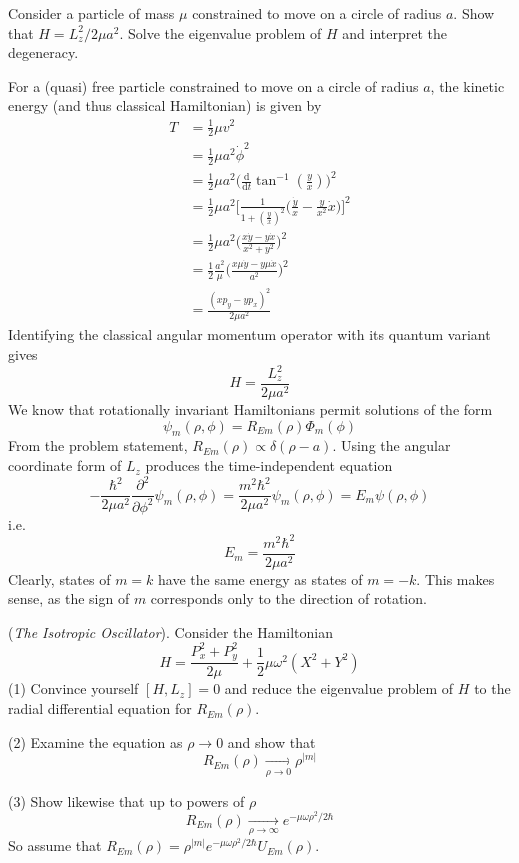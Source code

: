 \documentclass[../principles-of-quantum-mechanics.tex]{subfiles}
\begin{document}
\begin{questions}
	\question Consider a particle of mass $\mu$ constrained to move on a circle of radius $a$. Show that $H = L_z^2/2\mu a^2$. Solve the eigenvalue problem of $H$ and interpret the degeneracy.
	\begin{solution}
		For a (quasi) free particle constrained to move on a circle of radius $a$, the kinetic energy (and thus classical Hamiltonian) is given by
		\begin{align*}
			T &= \frac{1}{2}\mu v^2 \\
			&= \frac{1}{2}\mu a^2\dot{\phi}^2 \\
			&= \frac{1}{2}\mu a^2\Big(\frac{\mathrm{d}}{\mathrm{d}t}\tan^{-1}(\tfrac{y}{x})\Big)^2 \\
			&= \frac{1}{2}\mu a^2\Big[\frac{1}{1 + (\tfrac{y}{x})^2}\Big(\frac{\dot{y}}{x} - \frac{y}{x^2}\dot{x}\Big)\Big]^2 \\
			&= \frac{1}{2}\mu a^2\Big(\frac{x\dot{y} - y\dot{x}}{x^2 + y^2}\Big)^2 \\
			&= \frac{1}{2}\frac{a^2}{\mu}\Big(\frac{x\mu\dot{y} - y\mu\dot{x}}{a^2}\Big)^2 \\
			&= \frac{(xp_y - yp_x)^2}{2\mu a^2}
		\end{align*}
		Identifying the classical angular momentum operator with its quantum variant gives
		$$H = \frac{L_z^2}{2\mu a^2}$$
		We know that rotationally invariant Hamiltonians permit solutions of the form
		$$\psi_m(\rho, \phi) = R_{\textit{Em}}(\rho)\Phi_m(\phi)$$
		From the problem statement, $R_{\textit{Em}}(\rho)\propto\delta(\rho - a)$. Using the angular coordinate form of $L_z$ produces the time-independent equation
		$$-\frac{\hbar^2}{2\mu a^2}\frac{\partial^2}{\partial\phi^2}\psi_m(\rho, \phi) = \frac{m^2\hbar^2}{2\mu a^2}\psi_m(\rho, \phi) = E_m\psi(\rho, \phi)$$
		i.e. 
		$$E_m = \frac{m^2\hbar^2}{2\mu a^2}$$
		Clearly, states of $m = k$ have the same energy as states of $m = -k$. This makes sense, as the sign of $m$ corresponds only to the direction of rotation.
	\end{solution}
	
	\question (\textit{The Isotropic Oscillator}). Consider the Hamiltonian
	$$H = \frac{P_x^2 + P_y^2}{2\mu} + \frac{1}{2}\mu\omega^2(X^2 + Y^2)$$
	(1) Convince yourself $[H, L_z] = 0$ and reduce the eigenvalue problem of $H$ to the radial differential equation for $R_{\textit{Em}}(\rho)$.
	
	(2) Examine the equation as $\rho \to 0$ and show that
	$$R_{\textit{Em}}(\rho)\xrightarrow[\rho \to 0]{} \rho^{|m|}$$
	
	(3) Show likewise that up to powers of $\rho$
	$$R_{\textit{Em}}(\rho)\xrightarrow[\rho\to\infty]{} e^{-\mu\omega\rho^2/2\hbar}$$
	So assume that $R_{\textit{Em}}(\rho) = \rho^{|m|}e^{-\mu\omega\rho^2/2\hbar}U_{\textit{Em}}(\rho)$.
	

\end{questions}
\end{document}
